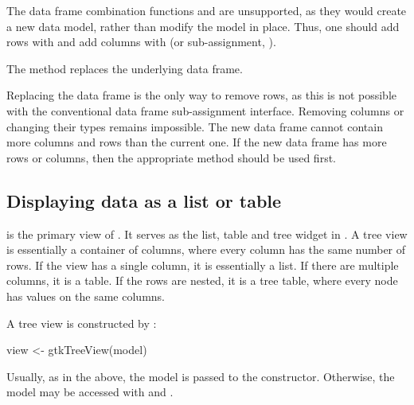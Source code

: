 The data frame combination functions  and
 are unsupported, as they would create a new data
model, rather than modify the model in place. Thus, one should add
rows with  and add columns with
 (or sub-assignment, 
\method{[\ASSIGN}{RGtkDataFrame}).

The  method replaces the underlying
data frame.
\begin{Schunk}
\end{Schunk}
%
Replacing the data frame is the only way to remove rows, as this is
not possible with the conventional data frame sub-assignment
interface. Removing columns or changing their types remains
impossible. The new data frame cannot contain more columns and rows
than the current one. If the new data frame has more rows or columns,
then the appropriate  method should be used first.

\subsection{Displaying data as a list or table}
\label{sec:RGtk2:mvc:GtkTreeView}

 is the primary view of .  It
serves as the list, table and tree widget in \GTK. A tree view is
essentially a container of columns, where every column has the same
number of rows. If the view has a single column, it is essentially a
list. If there are multiple columns, it is a table. If the rows are
nested, it is a tree table, where every node has values on the same
columns.

A tree view is constructed by :
\begin{Schunk}
\begin{Sinput}
 view <- gtkTreeView(model)
\end{Sinput}
\end{Schunk}
Usually, as in the above, the model is passed to the
constructor. Otherwise, the model may be accessed with
 and .


